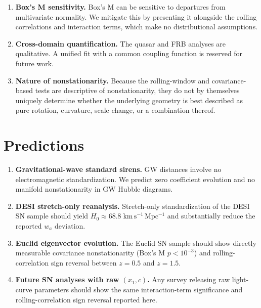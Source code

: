 \documentclass[twocolumn,showpacs,preprintnumbers,amsmath,amssymb,prl]{revtex4-2}
\begin{document}
\begin{enumerate}
\item \textbf{Box's M sensitivity.} Box's M can be sensitive to departures from multivariate normality. We mitigate this by presenting it alongside the rolling correlations and interaction terms, which make no distributional assumptions.

\item \textbf{Cross-domain quantification.} The quasar and FRB analyses are qualitative. A unified fit with a common coupling function is reserved for future work.

\item \textbf{Nature of nonstationarity.} Because the rolling-window and covariance-based tests are descriptive of nonstationarity, they do not by themselves uniquely determine whether the underlying geometry is best described as pure rotation, curvature, scale change, or a combination thereof.

\end{enumerate}

\section{Predictions}
\label{sec:predictions}

\begin{enumerate}

\item \textbf{Gravitational-wave standard sirens.} GW distances involve no electromagnetic standardization. We predict zero coefficient evolution and no manifold nonstationarity in GW Hubble diagrams.

\item \textbf{DESI stretch-only reanalysis.} Stretch-only standardization of the DESI SN sample should yield $H_0 \approx 68.8\;\mathrm{km\,s^{-1}\,Mpc^{-1}}$ and substantially reduce the reported $w_a$ deviation.

\item \textbf{Euclid eigenvector evolution.} The Euclid SN sample should show directly measurable covariance nonstationarity (Box's M $p < 10^{-3}$) and rolling-correlation sign reversal between $z = 0.5$ and $z = 1.5$.

\item \textbf{Future SN analyses with raw $(x_1, c)$.} Any survey releasing raw light-curve parameters should show the same interaction-term significance and rolling-correlation sign reversal reported here.

\end{enumerate}
\end{document}
